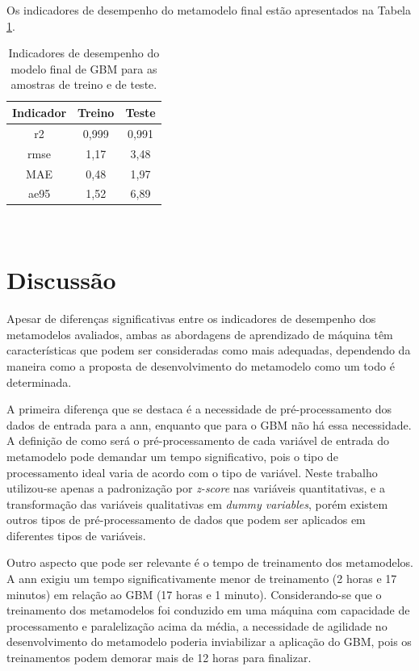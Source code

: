 \documentclass{article}
\begin{document}
Os indicadores de desempenho do metamodelo final estão apresentados na Tabela \ref{table:desempenho}. 

\begin{table}[!htb]
	\centering
	\caption{Indicadores de desempenho do modelo final de GBM para as amostras de treino e de teste. }
	\label{table:desempenho}
	\begin{tabular}{|c |c |c |}
		\hline
		\textbf{Indicador} & \textbf{Treino} & \textbf{Teste} \\
		\hline
		\acrshort{r2} & 0,999 & 0,991 \\
		\hline
		\acrshort{rmse} & 1,17 & 3,48 \\
		\hline
		MAE & 0,48 & 1,97 \\
		\hline
		\acrshort{ae95} & 1,52 & 6,89 \\
		\hline
	\end{tabular}\\
\end{table}

\section{Discussão}

Apesar de diferenças significativas entre os indicadores de desempenho dos metamodelos avaliados, ambas as abordagens de aprendizado de máquina têm características que podem ser consideradas como mais adequadas, dependendo da maneira como a proposta de desenvolvimento do metamodelo como um todo é determinada.

A primeira diferença que se destaca é a necessidade de pré-processamento dos dados de entrada para a \acrshort{ann}, enquanto que para o GBM não há essa necessidade.
A definição de como será o pré-processamento de cada variável de entrada do metamodelo pode demandar um tempo significativo, pois o tipo de processamento ideal varia de acordo com o tipo de variável.
Neste trabalho utilizou-se apenas a padronização por \textit{z-score} nas variáveis quantitativas, e a transformação das variáveis qualitativas em \textit{dummy variables}, porém existem outros tipos de pré-processamento de dados que podem ser aplicados em diferentes tipos de variáveis.

Outro aspecto que pode ser relevante é o tempo de treinamento dos metamodelos. 
A \acrshort{ann} exigiu um tempo significativamente menor de treinamento (2 horas e 17 minutos) em relação ao GBM (17 horas e 1 minuto).
Considerando-se que o treinamento dos metamodelos foi conduzido em uma máquina com capacidade de processamento e paralelização acima da média, a necessidade de agilidade no desenvolvimento do metamodelo poderia inviabilizar a aplicação do GBM, pois os treinamentos podem demorar mais de 12 horas para finalizar.
\end{document}
